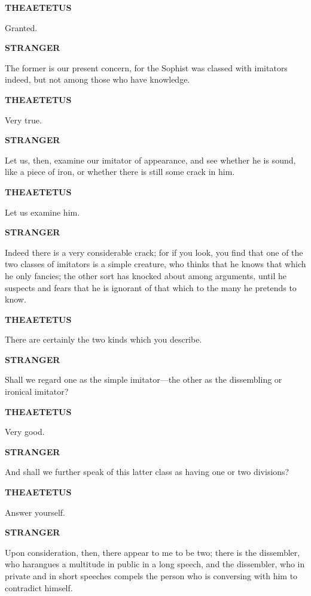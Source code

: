 \documentclass[11pt,letter]{article}
\begin{document}
\par \textbf{THEAETETUS}
\par   Granted.

\par \textbf{STRANGER}
\par   The former is our present concern, for the Sophist was classed with imitators indeed, but not among those who have knowledge.

\par \textbf{THEAETETUS}
\par   Very true.

\par \textbf{STRANGER}
\par   Let us, then, examine our imitator of appearance, and see whether he is sound, like a piece of iron, or whether there is still some crack in him.

\par \textbf{THEAETETUS}
\par   Let us examine him.

\par \textbf{STRANGER}
\par   Indeed there is a very considerable crack; for if you look, you find that one of the two classes of imitators is a simple creature, who thinks that he knows that which he only fancies; the other sort has knocked about among arguments, until he suspects and fears that he is ignorant of that which to the many he pretends to know.

\par \textbf{THEAETETUS}
\par   There are certainly the two kinds which you describe.

\par \textbf{STRANGER}
\par   Shall we regard one as the simple imitator—the other as the dissembling or ironical imitator?

\par \textbf{THEAETETUS}
\par   Very good.

\par \textbf{STRANGER}
\par   And shall we further speak of this latter class as having one or two divisions?

\par \textbf{THEAETETUS}
\par   Answer yourself.

\par \textbf{STRANGER}
\par   Upon consideration, then, there appear to me to be two; there is the dissembler, who harangues a multitude in public in a long speech, and the dissembler, who in private and in short speeches compels the person who is conversing with him to contradict himself.
\end{document}
